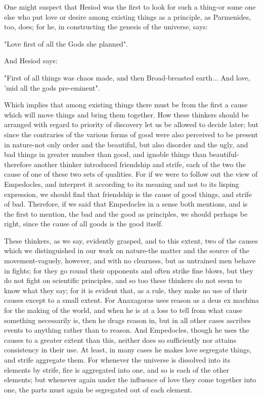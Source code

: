 \documentclass{article}
\begin{document}
One might suspect that Hesiod was the first to look for such a thing-or some one else who put love or desire among existing things as a principle, as Parmenides, too, does; for he, in constructing the genesis of the universe, says:

"Love first of all the Gods she planned".

And Hesiod says:

"First of all things was chaos made, and then Broad-breasted earth... And love, 'mid all the gods pre-eminent".

Which implies that among existing things there must be from the first a cause which will move things and bring them together. How these thinkers should be arranged with regard to priority of discovery let us be allowed to decide later; but since the contraries of the various forms of good were also perceived to be present in nature-not only order and the beautiful, but also disorder and the ugly, and bad things in greater number than good, and ignoble things than beautiful-therefore another thinker introduced friendship and strife, each of the two the cause of one of these two sets of qualities. For if we were to follow out the view of Empedocles, and interpret it according to its meaning and not to its lisping expression, we should find that friendship is the cause of good things, and strife of bad. Therefore, if we said that Empedocles in a sense both mentions, and is the first to mention, the bad and the good as principles, we should perhaps be right, since the cause of all goods is the good itself.

These thinkers, as we say, evidently grasped, and to this extent, two of the causes which we distinguished in our work on nature-the matter and the source of the movement-vaguely, however, and with no clearness, but as untrained men behave in fights; for they go round their opponents and often strike fine blows, but they do not fight on scientific principles, and so too these thinkers do not seem to know what they say; for it is evident that, as a rule, they make no use of their causes except to a small extent. For Anaxagoras uses reason as a deus ex machina for the making of the world, and when he is at a loss to tell from what cause something necessarily is, then he drags reason in, but in all other cases ascribes events to anything rather than to reason. And Empedocles, though he uses the causes to a greater extent than this, neither does so sufficiently nor attains consistency in their use. At least, in many cases he makes love segregate things, and strife aggregate them. For whenever the universe is dissolved into its elements by strife, fire is aggregated into one, and so is each of the other elements; but whenever again under the influence of love they come together into one, the parts must again be segregated out of each element.
\end{document}
